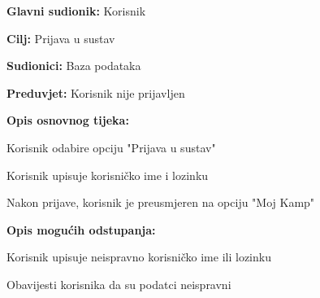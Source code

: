 					\noindent {}
					\begin{packed_item}
						
						\item \textbf{Glavni sudionik: } Korisnik
						\item  \textbf{Cilj:} Prijava u sustav
						\item  \textbf{Sudionici:} Baza podataka
						\item  \textbf{Preduvjet:} Korisnik nije prijavljen
						\item  \textbf{Opis osnovnog tijeka:}
						
						\item[] \begin{packed_enum}
							
							\item Korisnik odabire opciju "Prijava u sustav"
							\item Korisnik upisuje korisničko ime i lozinku
							\item Nakon prijave, korisnik je preusmjeren na opciju "Moj Kamp"
						
						\end{packed_enum}
						
						\item  \textbf{Opis mogućih odstupanja:}
						
						\item[] \begin{packed_item}
							
							\item[2.a] Korisnik upisuje neispravno korisničko ime ili lozinku
							\item[] \begin{packed_enum}
								
								\item Obavijesti korisnika da su podatci neispravni
							\end{packed_enum}
						\end{packed_item}
					\end{packed_item}
				
